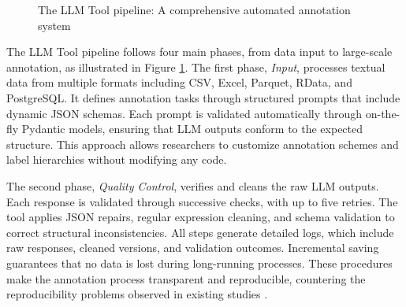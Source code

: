 \documentclass[12pt]{article}
\begin{document}
\begin{figure}[b!]
%
\caption{The LLM Tool pipeline: A comprehensive automated annotation system}
\label{fig:llm_tool_concept}
\end{figure}

The LLM Tool pipeline follows four main phases, from data input to large-scale annotation, as illustrated in Figure \ref{fig:llm_tool_concept}. The first phase, \emph{Input}, processes textual data from multiple formats including CSV, Excel, Parquet, RData, and PostgreSQL. It defines annotation tasks through structured prompts that include dynamic JSON schemas. Each prompt is validated automatically through on-the-fly Pydantic models, ensuring that LLM outputs conform to the expected structure. This approach allows researchers to customize annotation schemes and label hierarchies without modifying any code. 

The second phase, \emph{Quality Control}, verifies and cleans the raw LLM outputs. Each response is validated through successive checks, with up to five retries. The tool applies JSON repairs, regular expression cleaning, and schema validation to correct structural inconsistencies. All steps generate detailed logs, which include raw responses, cleaned versions, and validation outcomes. Incremental saving guarantees that no data is lost during long-running processes. These procedures make the annotation process transparent and reproducible, countering the reproducibility problems observed in existing studies \parencite{chen_etal23, weber_reichardt23, zhao_etal24}.
\end{document}

